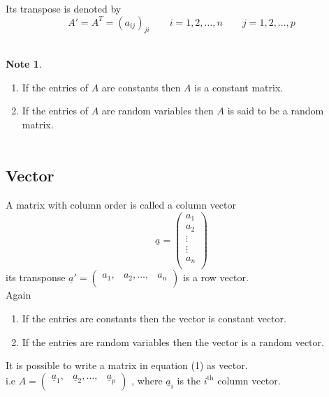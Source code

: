 \documentclass[11pt,a4paper]{article}
\theoremstyle{definition}
\newtheorem{note}[thm]{Note}
\begin{document}
Its transpose is denoted by $$A' = A^T = (a_{ij})_{ji}\qquad i = 1,2,\ldots,n\qquad j=1,2,\ldots,p$$\\



\begin{note}
\begin{enumerate}
\item If the entries of $A$ are constants then $A$ is a constant matrix.
\item If the entries of $A$ are random variables then $A$ is said to be a random matrix.\\\\
\end{enumerate}
\end{note}
















\subsection{Vector}
A matrix with column order is called  a column vector
\begin{equation}\tag{2}
\underline{a} = 
\begin{pmatrix}
a_1\\
a_2\\
\vdots\\
\vdots\\
a_n\\
\end{pmatrix}
\end{equation}
its transponse $\underline{a}'=
\begin{pmatrix}
a_1, & a_2, \ldots, & a_n\\
\end{pmatrix}$ is a row vector.\\

Again 
\begin{enumerate}
\item If the entries are constants then the vector is constant vector.
\item If the entries are random variables then the vector is a random vector.\\
\end{enumerate}


It is possible to write a matrix in equation (1) as vector.\\
i.e $A = \begin{pmatrix}
\underline{a}_1, & \underline{a}_2, \ldots, & \underline{a}_p\\
\end{pmatrix}$ , where $\underline{a}_i$ is the $i^{\text{th}}$ column vector.\\\\\\
\end{document}
